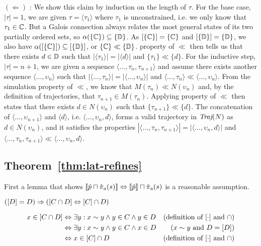 $(\Leftarrow)$ : We show this claim by induction on the length of $\tau$. For the base case, $| \tau | = 1$, we are given $\tau = \langle \tau_{1} \rangle$ where $\tau_{1}$ is unconstrained, i.e. we only know that $\tau_{1} \in \mathbb{C}$. But a Galois connection always relates the most general states of its two partially ordered sets, so $\alpha(\{ \mathbb{C} \}) \subseteq \{ \mathbb{D} \}$. As $[\{ \mathbb{C} \}] = \{ \mathbb{C} \}$ and $[\{ \mathbb{D} \}] = \{ \mathbb{D} \}$, we also have $\alpha([\{ \mathbb{C} \}]) \subseteq [\{ \mathbb{D} \}]$, or $\{ \mathbb{C} \} \ll \{ \mathbb{D} \}$.  property of $\ll$ then tells us that there exists $d \in \mathbb{D}$ such that $|\langle \tau_{1} \rangle| = |\langle d \rangle|$ and $\{ \tau_{1} \} \ll \{ d \}$. For the inductive step, $| \tau | = n + 1$, we are given a sequence $\langle \dots, \tau_{n}, \tau_{n+1} \rangle$ and assume there exists another sequence $\langle \dots, \upsilon_{n} \rangle$ such that $|\langle \dots, \tau_{n} \rangle| = |\langle \dots, \upsilon_{n} \rangle|$ and $\langle \dots, \tau_{n} \rangle \ll \langle \dots, \upsilon_{n} \rangle$. From the simulation property of $\ll$, we know that $M(\tau_{n}) \ll N(\upsilon_{n})$ and, by the definition of trajectories, that $\tau_{n+1} \in M(\tau_{n})$. Applying  property of $\ll$ then states that there exists $d \in N(\upsilon_{n})$ such that $\{ \tau_{n+1} \} \ll \{ d \}$. The concatenation of $\langle \dots, \upsilon_{n+1} \rangle$ and $\langle d \rangle$, i.e. $\langle \dots, \upsilon_{n}, d \rangle$, forms a valid trajectory in $\operatorname{\textit{Traj}}(N)$ as $d \in N(\upsilon_{n})$, and it satisfies the properties $| \langle \dots, \tau_{n}, \tau_{n+1} \rangle | = | \langle \dots, \upsilon_{n}, d \rangle |$ and $\langle \dots, \tau_{n}, \tau_{n+1} \rangle \ll \langle \dots, \upsilon_{n}, d \rangle$. %


\subsection{Theorem~\ref{thm:lat-refines}}

First a lemma that shows $\llbracket \hat p \sqcap \operatorname{\hat{\pi}_{\textrm{a}}}(s) \rrbracket \Leftrightarrow \llbracket \hat p \rrbracket \sqcap \operatorname{\hat{\pi}_{\textrm{a}}}(s)$ is a reasonable assumption.

\begin{lemma}
$([D] = D) \Rightarrow ([C \cap D] \Leftrightarrow [C] \cap D)$
\end{lemma}
%
\begin{align*}
x \in [C \cap D] & \Leftrightarrow \exists y : x \sim y \wedge y \in C \wedge y \in D & (\textrm{definition of } [\cdot] \textrm{ and } \cap) \\
                     & \Leftrightarrow \exists y : x \sim y \wedge y \in C \wedge x \in D & (x \sim y \textrm{ and } D = [D]) \\
                     & \Leftrightarrow x \in [C] \cap D                               & (\textrm{definition of } [\cdot] \textrm { and } \cap)
\end{align*}

